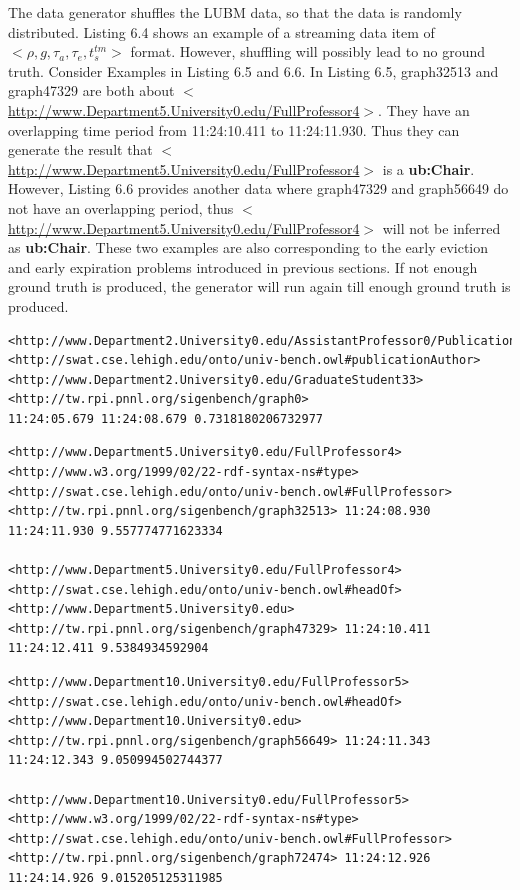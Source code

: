 The data generator shuffles the LUBM data, so that the data is randomly distributed.
Listing 6.4 shows an example of a streaming data item of $<\rho, g, \tau_{a}, \tau_{e}, t^{tm}_{s}>$ format.
However, shuffling will possibly lead to no ground truth. 
Consider Examples in Listing 6.5 and 6.6. 
In Listing 6.5, graph32513 and graph47329 are both about $<$\url{http://www.Department5.University0.edu/FullProfessor4}$>$. 
They have an overlapping time period from 11:24:10.411 to 11:24:11.930.
Thus they can generate the result that $<$\url{http://www.Department5.University0.edu/FullProfessor4}$>$ is a \textbf{ub:Chair}.
However, Listing 6.6 provides another data where graph47329 and graph56649 do not have an overlapping period, thus $<$\url{http://www.Department5.University0.edu/FullProfessor4}$>$ will not be inferred as \textbf{ub:Chair}.
These two examples are also corresponding to the early eviction and early expiration problems introduced in previous sections. 
If not enough ground truth is produced, the generator will run again till enough ground truth is produced.

\begin{lstlisting}[caption={Generated RDF Stream Example 1},basicstyle=\tiny,frame=single]
<http://www.Department2.University0.edu/AssistantProfessor0/Publication7> 
<http://swat.cse.lehigh.edu/onto/univ-bench.owl#publicationAuthor>
<http://www.Department2.University0.edu/GraduateStudent33> 
<http://tw.rpi.pnnl.org/sigenbench/graph0> 
11:24:05.679 11:24:08.679 0.7318180206732977
\end{lstlisting}

\begin{lstlisting}[caption={Generated RDF Stream Example 2},basicstyle=\tiny,frame=single]
<http://www.Department5.University0.edu/FullProfessor4>
<http://www.w3.org/1999/02/22-rdf-syntax-ns#type>
<http://swat.cse.lehigh.edu/onto/univ-bench.owl#FullProfessor>
<http://tw.rpi.pnnl.org/sigenbench/graph32513> 11:24:08.930 11:24:11.930 9.557774771623334

<http://www.Department5.University0.edu/FullProfessor4>
<http://swat.cse.lehigh.edu/onto/univ-bench.owl#headOf>
<http://www.Department5.University0.edu>
<http://tw.rpi.pnnl.org/sigenbench/graph47329> 11:24:10.411 11:24:12.411 9.5384934592904
\end{lstlisting}

\begin{lstlisting}[caption={Generated RDF Stream Example 3},basicstyle=\tiny,frame=single]
<http://www.Department10.University0.edu/FullProfessor5>
<http://swat.cse.lehigh.edu/onto/univ-bench.owl#headOf>
<http://www.Department10.University0.edu>
<http://tw.rpi.pnnl.org/sigenbench/graph56649> 11:24:11.343 11:24:12.343 9.050994502744377

<http://www.Department10.University0.edu/FullProfessor5>
<http://www.w3.org/1999/02/22-rdf-syntax-ns#type>
<http://swat.cse.lehigh.edu/onto/univ-bench.owl#FullProfessor>
<http://tw.rpi.pnnl.org/sigenbench/graph72474> 11:24:12.926 11:24:14.926 9.015205125311985
\end{lstlisting}
%
